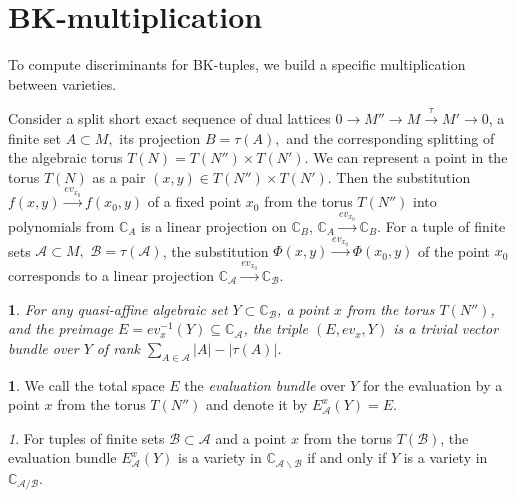 \documentclass[11pt]{article}
\theoremstyle{plain}
\theoremstyle{definition}
\newtheorem{defn}[thm]{\protect\definitionname}
\theoremstyle{remark}
\newtheorem{rem}[thm]{\protect\remarkname}
\theoremstyle{plain}
\newtheorem{lem}[thm]{\protect\lemmaname}
\theoremstyle{plain}
\theoremstyle{plain}
\theoremstyle{definition}
\providecommand{\definitionname}{Definition}
\providecommand{\lemmaname}{Lemma}
\providecommand{\remarkname}{Remark}
\begin{document}
\section{\label{Section. BK-multiplicaiton}BK-multiplication}

To compute discriminants for BK-tuples, we build a specific multiplication
between varieties. 

Consider a split short exact sequence of dual lattices $0\rightarrow M''\rightarrow M\overset{\tau}{\rightarrow}M'\rightarrow0$,
a finite set $A\subset M,$ its projection $B=\tau(A),$ and the corresponding
splitting of the algebraic torus $T(N)=T(N'')\times T(N')$. We can
represent a point in the torus $T(N)$ as a pair $(x,y)\in T(N'')\times T(N').$
Then the substitution $f(x,y)\overset{ev_{x_{0}}}{\longrightarrow}f(x_{0},y)$
of a fixed point $x_{0}$ from the torus $T(N'')$ into polynomials
from $\mathbb{C}_{A}$ is a linear projection on $\mathbb{C}_{B}$,
$\mathbb{C}_{A}\overset{ev_{x_{0}}}{\longrightarrow}\mathbb{C}_{B}$.
For a tuple of finite sets $\mathscr{A}\subset M,$ $\mathscr{B}=\tau(\mathscr{A})$,
the substitution $\Phi(x,y)\overset{ev_{x_{0}}}{\longrightarrow}\Phi(x_{0},y)$
of the point $x_{0}$ corresponds to a linear projection $\mathbb{C}_{\mathscr{A}}\overset{ev_{x_{0}}}{\longrightarrow}\mathbb{C}_{\mathscr{B}}$.
\begin{lem}
\label{Lemma. Evaluation bundle is a trivial vector bundle}For any
quasi-affine algebraic set $Y\subset\mathbb{C}_{\mathscr{B}}$, a
point $x$ from the torus $T(N'')$, and the preimage $E=ev_{x}^{-1}(Y)\subseteq\mathbb{C}_{\mathscr{A}}$,
the triple $(E,ev_{x},Y)$ is a trivial vector bundle over $Y$ of
rank $\underset{A\in\mathscr{A}}{\sum}|A|-|\tau(A)|$.
\end{lem}

\begin{defn}
We call the total space $E$ the \textit{evaluation bundle} over $Y$
for the evaluation by a point $x$ from the torus $T(N'')$ and denote
it by $E_{\mathscr{A}}^{x}(Y)=E$.
\end{defn}

\begin{rem}
\label{Remark. Evaluation bundle}For tuples of finite sets $\mathscr{B}\subset\mathscr{A}$
and a point $x$ from the torus $T(\mathscr{B})$, the evaluation
bundle $E_{\mathscr{A}}^{x}(Y)$ is a variety in $\mathbb{C}_{\mathscr{A}\backslash\mathscr{B}}$
if and only if $Y$ is a variety in $\mathbb{C}_{\mathscr{A}/\mathscr{B}}$. 
\end{rem}
\end{document}
